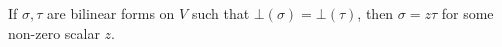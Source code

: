 If $\sigma, \tau$ are bilinear forms on $V$ such that $\bot(\sigma) = \bot(\tau)$, then $\sigma = z\tau$ for some non-zero scalar $z$.
